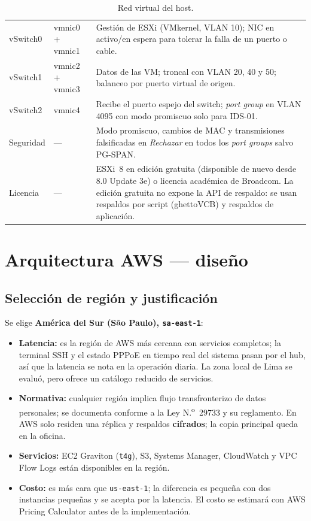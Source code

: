 \begin{table}[htbp]
\centering
\caption{Red virtual del host.}
\label{tab:ce03-vswitch}
\small
\begin{tabularx}{\textwidth}{L{2.2cm}L{2.6cm}X}
\toprule
vSwitch0 & vmnic0 + vmnic1 & Gestión de ESXi (VMkernel, VLAN 10); NIC en activo/en espera para tolerar la falla de un puerto o cable. \\
vSwitch1 & vmnic2 + vmnic3 & Datos de las VM; troncal con VLAN 20, 40 y 50; balanceo por puerto virtual de origen. \\
vSwitch2 & vmnic4 & Recibe el puerto espejo del switch; \emph{port group} en VLAN 4095 con modo promiscuo solo para IDS-01. \\
Seguridad & --- & Modo promiscuo, cambios de MAC y transmisiones falsificadas en \emph{Rechazar} en todos los \emph{port groups} salvo PG-SPAN. \\
Licencia & --- & ESXi~8 en edición gratuita (disponible de nuevo desde 8.0 Update 3e) o licencia académica de Broadcom. La edición gratuita no expone la API de respaldo: se usan respaldos por script (ghettoVCB) y respaldos de aplicación. \\
\bottomrule
\end{tabularx}
\end{table}

\section{Arquitectura AWS --- diseño}

\subsection{Selección de región y justificación}

Se elige \textbf{América del Sur (São Paulo), \texttt{sa-east-1}}:
\begin{itemize}
  \item \textbf{Latencia:} es la región de AWS más cercana con servicios completos; la
  terminal SSH y el estado PPPoE en tiempo real del sistema pasan por el hub, así que
  la latencia se nota en la operación diaria. La zona local de Lima se evaluó, pero
  ofrece un catálogo reducido de servicios.
  \item \textbf{Normativa:} cualquier región implica flujo transfronterizo de datos
  personales; se documenta conforme a la Ley N.\textsuperscript{o}~29733 y su
  reglamento. En AWS solo residen una réplica y respaldos \textbf{cifrados}; la copia
  principal queda en la oficina.
  \item \textbf{Servicios:} EC2 Graviton (\texttt{t4g}), S3, Systems Manager,
  CloudWatch y VPC Flow Logs están disponibles en la región.
  \item \textbf{Costo:} es más cara que \texttt{us-east-1}; la diferencia es pequeña
  con dos instancias pequeñas y se acepta por la latencia. El costo se estimará con
  AWS Pricing Calculator antes de la implementación.
\end{itemize}

